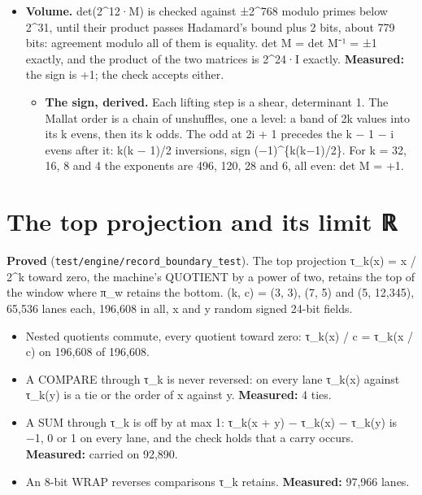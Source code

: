 \begin{itemize}
\item \textbf{Volume.} det(2\textasciicircum{}12·M) is checked against ±2\textasciicircum{}768 modulo primes below 2\textasciicircum{}31, until their product passes Hadamard's bound plus 2 bits, about 779 bits: agreement modulo all of them is equality. det M = det M⁻¹ = ±1 exactly, and the product of the two matrices is 2\textasciicircum{}24·I exactly. \textbf{Measured:} the sign is +1; the check accepts either.

\begin{itemize}
\item \textbf{The sign, derived.} Each lifting step is a shear, determinant 1. The Mallat order is a chain of unshuffles, one a level: a band of 2k values into its k evens, then its k odds. The odd at 2i + 1 precedes the k − 1 − i evens after it: k(k − 1)/2 inversions, sign (−1)\textasciicircum{}\{k(k−1)/2\}. For k = 32, 16, 8 and 4 the exponents are 496, 120, 28 and 6, all even: det M = +1.
\end{itemize}
\end{itemize}

\section{\texorpdfstring{The top projection and its limit ℝ}{The top projection and its limit ℝ}}

\textbf{Proved} (\texttt{test/\allowbreak{}engine/\allowbreak{}record\_\allowbreak{}boundary\_\allowbreak{}test}). The top projection τ\_\allowbreak{}k(x) = x / 2\textasciicircum{}k toward zero, the machine's QUOTIENT by a power of two, retains the top of the window where π\_\allowbreak{}w retains the bottom. (k, c) = (3, 3), (7, 5) and (5, 12,345), 65,536 lanes each, 196,608 in all, x and y random signed 24-bit fields.

\begin{itemize}
\item Nested quotients commute, every quotient toward zero: τ\_\allowbreak{}k(x) / c = τ\_\allowbreak{}k(x / c) on 196,608 of 196,608.
\item A COMPARE through τ\_\allowbreak{}k is never reversed: on every lane τ\_\allowbreak{}k(x) against τ\_\allowbreak{}k(y) is a tie or the order of x against y. \textbf{Measured:} 4 ties.
\item A SUM through τ\_\allowbreak{}k is off by at max 1: τ\_\allowbreak{}k(x + y) − τ\_\allowbreak{}k(x) − τ\_\allowbreak{}k(y) is −1, 0 or 1 on every lane, and the check holds that a carry occurs. \textbf{Measured:} carried on 92,890.
\item An 8-bit WRAP reverses comparisons τ\_\allowbreak{}k retains. \textbf{Measured:} 97,966 lanes.
\end{itemize}

